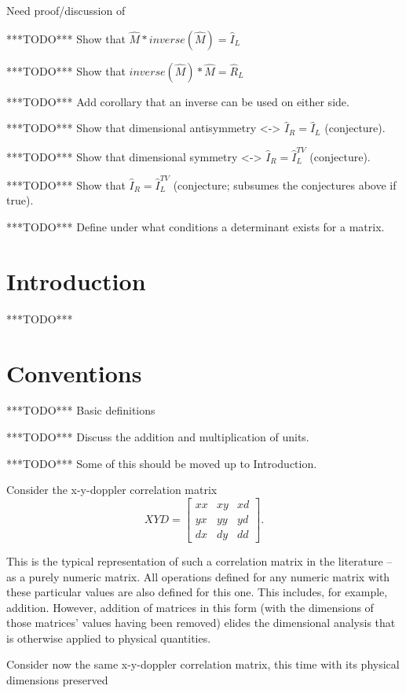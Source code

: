 \documentclass[10pt,letterpaper]{article}
\author{T. Zachary Laine}
\numberwithin{equation}{section}
\begin{document}
Need proof/discussion of

***TODO*** Show that $\hat M * inverse(\hat M) = \hat I_L$

***TODO*** Show that $inverse(\hat M) * \hat M = \hat R_L$

***TODO*** Add corollary that an inverse can be used on either side.

***TODO*** Show that dimensional antisymmetry <-> $\hat I_R = \hat I_L$ (conjecture).

***TODO*** Show that dimensional symmetry <-> $\hat I_R = \hat I_L^{TV}$ (conjecture).

***TODO*** Show that $\hat I_R = \hat I_L^{TV}$ (conjecture; subsumes the
conjectures above if true).

***TODO*** Define under what conditions a determinant exists for a matrix.


\section{Introduction}

***TODO***

\section{Conventions}

***TODO*** Basic definitions

***TODO*** Discuss the addition and multiplication of units.

***TODO*** Some of this should be moved up to Introduction.

Consider the x-y-doppler correlation matrix
\[XYD = \left[ \begin{matrix}
xx & xy & xd \\ yx & yy & yd \\ dx & dy & dd
\end{matrix} \right]. \]

This is the typical representation of such a correlation matrix in the
literature – as a purely numeric matrix.  All operations defined for
any numeric matrix with these particular values are also defined for
this one.  This includes, for example, addition.  However, addition of
matrices in this form (with the dimensions of those matrices' values
having been removed) elides the dimensional analysis that is otherwise
applied to physical quantities.

Consider now the same x-y-doppler correlation matrix, this time with
its physical dimensions preserved
\end{document}

